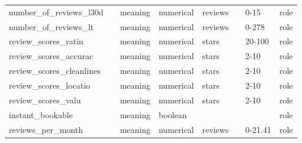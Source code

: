 \begin{center}
\begin{xltabular}{\textwidth}{llXlllll}
number\_of\_reviews\_l30d   &                             & meaning                           & numerical   & reviews        &                             &                     0-15    & role \\
number\_of\_reviews\_lt     &                             & meaning                           & numerical   & reviews        &                             &                     0-278   & role \\
review\_scores\_ratin       &                             & meaning                           & numerical   & stars          &                             &                     20-100  & role \\
review\_scores\_accurac     &                             & meaning                           & numerical   & stars          &                             &                     2-10    & role \\
review\_scores\_cleanlines  &                             & meaning                           & numerical   & stars          &                             &                     2-10    & role \\
review\_scores\_locatio     &                             & meaning                           & numerical   & stars          &                             &                     2-10    & role \\
review\_scores\_valu        &                             & meaning                           & numerical   & stars          &                             &                     2-10    & role \\
instant\_bookable           &                             & meaning                           & boolean     &                &                             &                     & role \\
reviews\_per\_month         &                             & meaning                           & numerical   & reviews        &                             &                     0-21.41 & role \\ \bottomrule
\end{xltabular}

\end{center}
